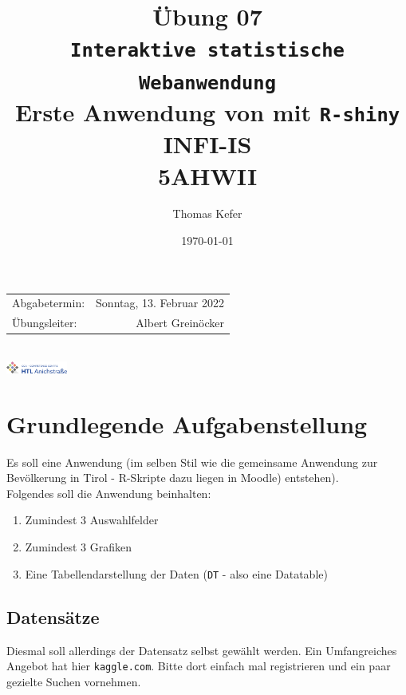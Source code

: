 \documentclass{article}
\title{Übung 07 \\ \texttt{Interaktive statistische Webanwendung} \\ Erste Anwendung von mit \texttt{R-shiny} \\ INFI-IS \\ 5AHWII}
\author{Thomas Kefer} %
\date{\today} %
\begin{document}
\maketitle %

\begin{center}
\begin{tabular}{l r}
Abgabetermin: &  Sonntag, 13. Februar 2022 \\
Übungsleiter: & Albert Greinöcker %
\end{tabular} \\ 
\vspace{1cm}
\includegraphics[width=2cm]{../images/logo.png}
\end{center}


\section{Grundlegende Aufgabenstellung}

Es soll eine Anwendung (im selben Stil wie die gemeinsame Anwendung zur Bevölkerung in Tirol - R-Skripte dazu liegen in Moodle) entstehen). \\

Folgendes soll die Anwendung beinhalten:

\begin{enumerate}
	\item Zumindest 3 Auswahlfelder
	\item Zumindest 3 Grafiken
	\item Eine Tabellendarstellung der Daten (\texttt{DT} -  also eine Datatable)
\end{enumerate}



\subsection{Datensätze}

Diesmal soll allerdings der Datensatz selbst gewählt werden. Ein Umfangreiches Angebot hat hier \texttt{kaggle.com}. Bitte dort einfach mal registrieren und ein paar gezielte Suchen vornehmen. \\
\end{document}
